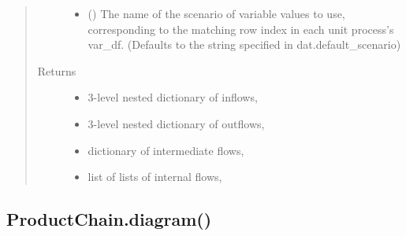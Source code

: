 \documentclass[a4paper,10pt,english]{sphinxmanual}
\begin{document}
\begin{fulllineitems}
\begin{quote}
\begin{description}
\begin{itemize}
\item {} 
 () \textendash{} The name of the scenario of variable values to use,
corresponding to the matching row index in each unit process’s
var\_df.
(Defaults to the string specified in dat.default\_scenario)

\end{itemize}

\item[{Returns}] \leavevmode
\begin{itemize}
\item {} 
3-level nested dictionary of inflows, 

\item {} 
3-level nested dictionary of outflows, 

\item {} 
dictionary of intermediate flows, 

\item {} 
list of lists of internal flows, 

\end{itemize}


\end{description}\end{quote}

\end{fulllineitems}



\subsection{ProductChain.diagram()}
\label{\detokenize{chain:productchain-diagram}}
\end{document}
